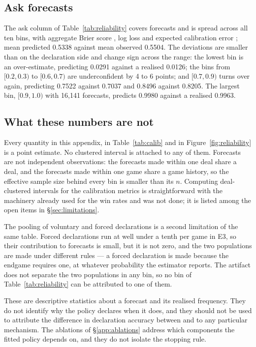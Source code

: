 \subsection{Ask forecasts}
\label{app:calib-ask}

The ask column of Table~\ref{tab:reliability} covers \numAskN{} forecasts and is
spread across all ten bins, with aggregate Brier score \numAskBrier{}, log loss
\numAskLogLoss{} and expected calibration error \numAskECE{}; mean predicted
0.5338 against mean observed 0.5504. The deviations are smaller than on the
declaration side and change sign across the range: the lowest bin is
an over-estimate, predicting 0.0291 against a realised 0.0126; the
bins from $[0.2,0.3)$ to $[0.6,0.7)$ are underconfident by 4 to 6 points; and
$[0.7,0.9)$ turns over again, predicting 0.7522 against 0.7037 and 0.8496
against 0.8205. The largest bin, $[0.9,1.0)$ with 16{,}141 forecasts, predicts
0.9980 against a realised 0.9963.

\subsection{What these numbers are not}
\label{app:calib-caveats}

Every quantity in this appendix, in Table~\ref{tab:calib} and in
Figure~\ref{fig:reliability} is a point estimate. No clustered interval is
attached to any of them. Forecasts are not independent observations: the
forecasts made within one deal share a deal, and the forecasts made within one
game share a game history, so the effective sample size behind every bin is
smaller than its $n$. Computing deal-clustered intervals for the calibration
metrics is straightforward with the machinery already used for the win rates and
was not done; it is listed among the open items in \S\ref{sec:limitations}.

The pooling of voluntary and forced declarations is a second limitation of the
same table. Forced declarations run at well under a tenth per game in E3, so
their contribution to \numDeclN{} forecasts is small, but it is not zero, and
the two populations are made under different rules --- a forced declaration is
made because the endgame requires one, at whatever probability the estimator
reports. The artifact does not separate the two populations in any bin, so no
bin of Table~\ref{tab:reliability} can be attributed to one of them.

These are descriptive statistics about a forecast and its realised frequency.
They do not identify why the policy declares when it does, and they should not
be used to attribute the difference in declaration accuracy between \vfast{} and
\vthree{} to any particular mechanism. The ablations of \S\ref{app:ablations}
address which components the fitted policy depends on, and they do not isolate
the stopping rule.
